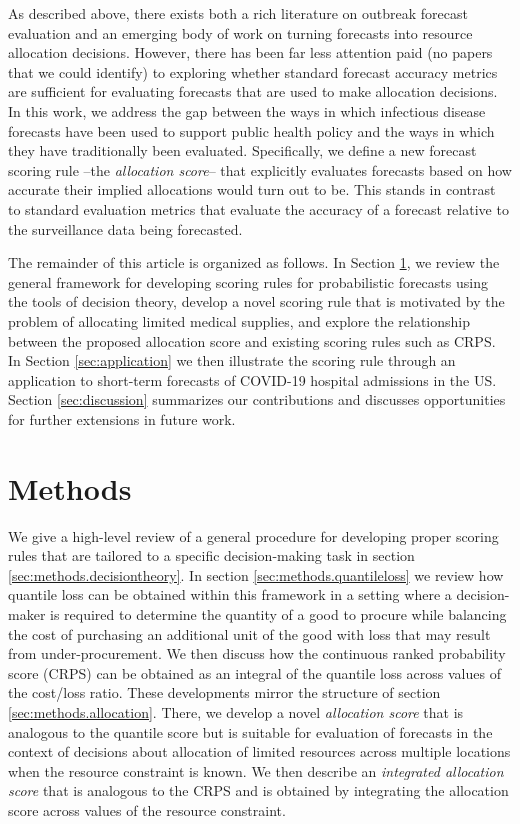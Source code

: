 \documentclass{article}
\begin{document}
As described above, there exists both a rich literature on outbreak forecast evaluation and an emerging body of work on turning forecasts into resource allocation decisions. 
However, there has been far less attention paid (no papers that we could identify) to exploring whether standard forecast accuracy metrics are sufficient for evaluating forecasts that are used to make allocation decisions.
In this work, we address the gap between the ways in which infectious disease forecasts have been used to support public health policy and the ways in which they have traditionally been evaluated. 
Specifically, we define a new forecast scoring rule --the {\em allocation score}-- that explicitly evaluates forecasts based on how accurate their implied allocations would turn out to be.
This stands in contrast to standard evaluation metrics that evaluate the accuracy of a forecast relative to the surveillance data being forecasted.

The remainder of this article is organized as follows. 
In Section \ref{sec:methods}, we review the general framework for developing scoring rules for probabilistic forecasts using the tools of decision theory, develop a novel scoring rule that is motivated by the problem of allocating limited medical supplies, and explore the relationship between the proposed allocation score and existing scoring rules such as CRPS. 
In Section \ref{sec:application} we then illustrate the scoring rule through an application to short-term forecasts of COVID-19 hospital admissions in the US. 
Section \ref{sec:discussion} summarizes our contributions and discusses opportunities for further extensions in future work.

\section{Methods}
\label{sec:methods}

We give a high-level review of a general procedure for developing proper scoring rules that are tailored to a specific decision-making task in section \ref{sec:methods.decisiontheory}. In section \ref{sec:methods.quantileloss} we review how quantile loss can be obtained within this framework in a setting where a decision-maker is required to determine the quantity of a good to procure while balancing the cost of purchasing an additional unit of the good with loss that may result from under-procurement. We then discuss how the continuous ranked probability score (CRPS) can be obtained as an integral of the quantile loss across values of the cost/loss ratio. These developments mirror the structure of section \ref{sec:methods.allocation}. There, we develop a novel \emph{allocation score} that is analogous to the quantile score but is suitable for evaluation of forecasts in the context of decisions about allocation of limited resources across multiple locations when the resource constraint is known. We then describe an \emph{integrated allocation score} that is analogous to the CRPS and is obtained by integrating the allocation score across values of the resource constraint.
\end{document}
